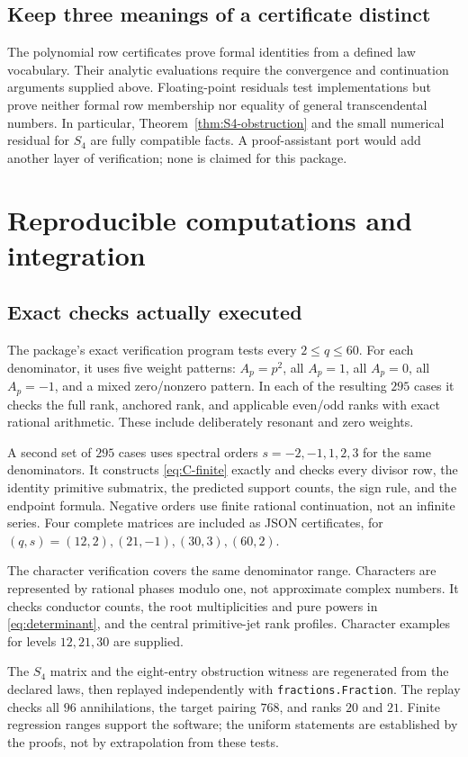 \documentclass[11pt]{article}
\numberwithin{equation}{section}
\theoremstyle{definition}
\theoremstyle{remark}
\newcommand{\code}[1]{\texttt{\small #1}}
\begin{document}
\subsection{Keep three meanings of a certificate distinct}
The polynomial row certificates prove formal identities from a defined
law vocabulary. Their analytic evaluations require the convergence and
continuation arguments supplied above. Floating-point residuals test
implementations but prove neither formal row membership nor equality of
general transcendental numbers. In particular, Theorem~\ref{thm:S4-obstruction}
and the small numerical residual for $S_4$ are fully compatible facts.
A proof-assistant port would add another layer of verification; none is
claimed for this package.

\section{Reproducible computations and integration}\label{sec:computations}

\subsection{Exact checks actually executed}
The package's exact verification program tests every $2\le q\le60$.
For each denominator, it uses five weight patterns: $A_p=p^2$, all
$A_p=1$, all $A_p=0$, all $A_p=-1$, and a mixed zero/nonzero pattern.
In each of the resulting $295$ cases it checks the full rank,
anchored rank, and applicable even/odd ranks with exact rational
arithmetic. These include deliberately resonant and zero weights.

A second set of $295$ cases uses spectral orders
$s=-2,-1,1,2,3$ for the same denominators. It constructs
\eqref{eq:C-finite} exactly and checks every divisor row, the identity
primitive submatrix, the predicted support counts, the sign rule, and
the endpoint formula. Negative orders use finite rational continuation,
not an infinite series. Four complete matrices are included as JSON
certificates, for $(q,s)=(12,2),(21,-1),(30,3),(60,2)$.

The character verification covers the same denominator range. Characters
are represented by rational phases modulo one, not approximate complex
numbers. It checks conductor counts, the root multiplicities and pure
powers in \eqref{eq:determinant}, and the central primitive-jet rank
profiles. Character examples for levels $12,21,30$ are supplied.

The $S_4$ matrix and the eight-entry obstruction witness are regenerated
from the declared laws, then replayed independently with
\code{fractions.Fraction}. The replay checks all $96$ annihilations,
the target pairing $768$, and ranks $20$ and $21$.
Finite regression ranges support the software; the uniform statements
are established by the proofs, not by extrapolation from these tests.
\end{document}
